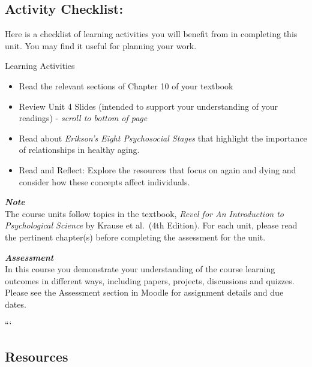 \documentclass[
]{book}
\providecommand{\tightlist}{%
  \setlength{\itemsep}{0pt}\setlength{\parskip}{0pt}}
\begin{document}
\hypertarget{activity-checklist-3}{%
\subsection*{Activity Checklist:}\label{activity-checklist-3}}

Here is a checklist of learning activities you will benefit from in completing this unit. You may find it useful for planning your work.

\begin{reflect}
{Learning Activities}

\begin{itemize}
\tightlist
\item
  Read the relevant sections of Chapter 10 of your textbook
\item
  Review Unit 4 Slides (intended to support your understanding of your readings) - \emph{scroll to bottom of page}
\item
  Read about \emph{Erikson's Eight Psychosocial Stages} that highlight the importance of relationships in healthy aging.
\item
  Read and Reflect: Explore the resources that focus on again and dying and consider how these concepts affect individuals.
\end{itemize}
\end{reflect}

\begin{caution}
\textbf{\emph{Note}}\\
The course units follow topics in the textbook, \emph{Revel for An Introduction to Psychological Science} by Krause et al.~(4th Edition). For each unit, please read the pertinent chapter(s) before completing the assessment for the unit.
\end{caution}

\begin{assessment}
\textbf{\emph{Assessment}}\\
In this course you demonstrate your understanding of the course learning outcomes in different ways, including papers, projects, discussions and quizzes. Please see the Assessment section in Moodle for assignment details and due dates.
\end{assessment}

```

\hypertarget{resources-3}{%
\subsection*{Resources}\label{resources-3}}
\end{document}
